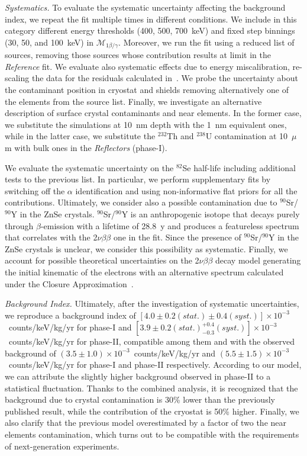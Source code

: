 \documentclass[%
reprint,
superscriptaddress,
altaffilletter,
showpacs,
showkeys,
amsmath, amssymb, aps,prl, floatfix
]{revtex4-1}
\newcommand{\BIoneexp}{$(3.5 \pm 1.0)\times 10^{-3}$}
\newcommand{\BItwoexp}{$(5.5 \pm 1.5)\times 10^{-3}$}
\newcommand{\BIonemodel}{$[4.0 \pm 0.2(stat.) \pm 0.4(syst.)]\times 10^{-3}$}
\newcommand{\BItwomodel}{$[3.9 \pm 0.2(stat.) _{-0.3}^{+0.4}(syst.)]\times 10^{-3}$}
\newcommand{\se}{$^{82}$Se\xspace}
\newcommand{\THO}{$^{232}\mathrm{Th}$\xspace}
\newcommand{\UR}{$^{238}\mathrm{U}$\xspace}
\newcommand{\SR}{$^{90}$Sr/$^{90}$Y\xspace}
\newcommand{\vv}{2$\nu\beta\beta$\xspace}
\newcommand{\ckky}{counts/keV/kg/yr\xspace}
\newcommand{\mspeconeb}{$\mathcal{M}_{1\beta/\gamma}$\xspace}
\newcommand{\phone}{phase-I\xspace}
\newcommand{\phtwo}{phase-II\xspace}
\begin{document}
{\it Systematics.} To evaluate the systematic uncertainty affecting the background index, we repeat the fit multiple times in different conditions. We include in this category different energy thresholds (400, 500, 700~keV) and fixed step binnings (30, 50, and 100~keV) in \mspeconeb. Moreover, we run the fit using a reduced list of sources, removing those sources whose contribution results at limit in the \textit{Reference} fit. We evaluate also systematic effects due to energy miscalibration, re-scaling the data for the residuals calculated in~\cite{Azzolini:2018yye}.
We probe the uncertainty about the contaminant position in cryostat and shields removing alternatively one of the elements from the source list. Finally, we investigate an alternative description of surface crystal contaminants and near elements. In the former case, we substitute the simulations at 10~nm depth with the 1~nm equivalent ones, while in the latter case, we substitute the \THO and \UR contamination at 10~$\mu$m with bulk ones in the {\it Reflectors} (\phone).

We evaluate the systematic uncertainty on the \se half-life including additional tests to the previous list. In particular, we perform supplementary fits by switching off the $\alpha$ identification and using non-informative flat priors for all the contributions. Ultimately, we consider also a possible contamination due to \SR in the ZnSe crystals.
\SR is an anthropogenic isotope that decays purely through $\beta$-emission with a lifetime of 28.8~y and produces a featureless spectrum that correlates with the \vv one in the fit. Since the presence of \SR in the ZnSe crystals is unclear, we consider this possibility as systematic. Finally, we account for possible theoretical uncertainties on the \vv decay model generating the initial kinematic of the electrons with an alternative spectrum calculated under the Closure Approximation~\cite{Kotila:2012zza}.

{\it Background Index.} Ultimately, after the investigation of systematic uncertainties, we reproduce a background index of \BIonemodel~\ckky for \phone and 
\BItwomodel~\ckky for \phtwo, compatible among them and with the observed background of \BIoneexp~\ckky and 
\BItwoexp~\ckky for \phone and \phtwo respectively.
According to our model, we can attribute the slightly higher background observed in \phtwo to a statistical fluctuation. Thanks to the combined analysis, it is recognized that the background due to crystal contamination is 30\% lower than the previously published result, while the contribution of the cryostat is 50\% higher. Finally, we also clarify that the previous model overestimated by a factor of two the near elements contamination, which turns out to be compatible with the requirements of next-generation experiments.
 
\end{document}
